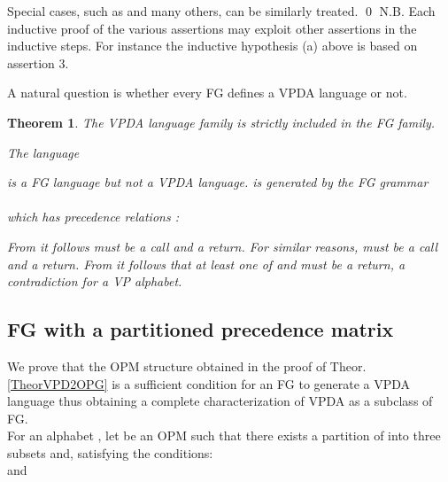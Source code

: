 \documentclass[3p,11pt]{elsarticle}
\newtheorem{theorem}{Theorem}[section]
\newenvironment{proof}[1][Proof]{\begin{trivlist}
\item[\hskip \labelsep {\bfseries #1}]}{\end{trivlist}}
\begin{document}
Special cases, such as  and many others, can be similarly treated.
 \qed
 N.B. Each inductive proof of the various assertions may exploit other assertions in the inductive steps.
 For instance the inductive hypothesis (a) above is based on assertion 3.
\par
\label{SectStrictInclus} A natural question is whether every FG defines a VPDA language or not.
\begin{theorem}\label{TheorStrictInclusion}
The VPDA language family is strictly included in the FG family.
\begin{proof}
\label{ProposCounterexample} The  language

is a FG language  but not a VPDA language.
  is generated by the FG grammar\\

\\
which has precedence relations :

From  it follows  must be a call and  a return. For similar reasons,  must be a call and  a return. From  it follows that at least one of  and  must be a return, a contradiction for a VP alphabet.
\end{proof}
\end{theorem}

\subsection*{FG with a partitioned precedence matrix}\label{SectRestrOPGareVPL}
We prove that the OPM structure obtained in the proof of Theor. \ref{TheorVPD2OPG} is a sufficient condition for an FG to generate a VPDA language thus obtaining a complete characterization of VPDA as a subclass of FG.
\\
For an alphabet , let  be an OPM such that there exists a partition of  into three subsets  and,  satisfying the conditions:
\\
 and 
\\

\\
\end{document}
